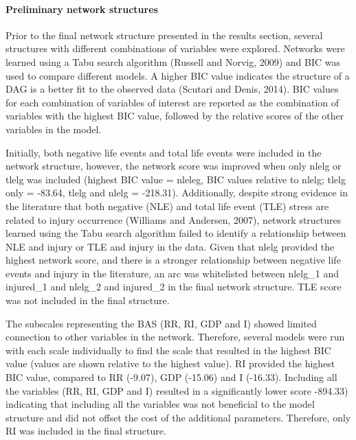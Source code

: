 \documentclass[
]{frontiersHLTH}
\begin{document}
\hypertarget{preliminary-network-structures}{%
\paragraph{Preliminary network
structures}\label{preliminary-network-structures}}

Prior to the final network structure presented in the results section,
several structures with different combinations of variables were
explored. Networks were learned using a Tabu search algorithm (Russell
and Norvig, 2009) and BIC was used to compare different models. A higher
BIC value indicates the structure of a DAG is a better fit to the
observed data (Scutari and Denis, 2014). BIC values for each combination
of variables of interest are reported as the combination of variables
with the highest BIC value, followed by the relative scores of the other
variables in the model.

Initially, both negative life events and total life events were included
in the network structure, however, the network score was improved when
only nlelg or tlelg was included (highest BIC value = nleleg, BIC values
relative to nlelg; tlelg only = -83.64, tlelg and nlelg = -218.31).
Additionally, despite strong evidence in the literature that both
negative (NLE) and total life event (TLE) stress are related to injury
occurrence (Williams and Andersen, 2007), network structures learned
using the Tabu search algorithm failed to identify a relationship
between NLE and injury or TLE and injury in the data. Given that nlelg
provided the highest network score, and there is a stronger relationship
between negative life events and injury in the literature, an arc was
whitelisted between nlelg\_1 and injured\_1 and nlelg\_2 and injured\_2
in the final network structure. TLE score was not included in the final
structure.

The subscales representing the BAS (RR, RI, GDP and I) showed limited
connection to other variables in the network. Therefore, several models
were run with each scale individually to find the scale that resulted in
the highest BIC value (values are shown relative to the highest value).
RI provided the highest BIC value, compared to RR (-9.07), GDP (-15.06)
and I (-16.33). Including all the variables (RR, RI, GDP and I) resulted
in a significantly lower score -894.33) indicating that including all
the variables was not beneficial to the model structure and did not
offset the cost of the additional parameters. Therefore, only RI was
included in the final structure.
\end{document}
